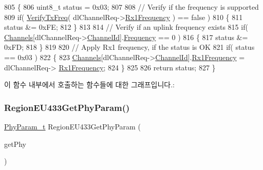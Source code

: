 \begin{DoxyCode}
805 \{
806     uint8\_t status = 0x03;
807 
808     \textcolor{comment}{// Verify if the frequency is supported}
809     \textcolor{keywordflow}{if}( \mbox{\hyperlink{_region_e_u433_8c_af6b3cfa164d4105815aaaa55f02d723e}{VerifyTxFreq}}( dlChannelReq->\mbox{\hyperlink{structs_dl_channel_req_params_a8a564b8635b12d5f0f348ae177dd92e1}{Rx1Frequency}} ) == \textcolor{keyword}{false} )
810     \{
811         status &= 0xFE;
812     \}
813 
814     \textcolor{comment}{// Verify if an uplink frequency exists}
815     \textcolor{keywordflow}{if}( \mbox{\hyperlink{_region_e_u433_8c_a989ac3355f1ed5b534b3940af3deeb14}{Channels}}[dlChannelReq->\mbox{\hyperlink{structs_dl_channel_req_params_ae23f953dc29c360e56a3c856404a3276}{ChannelId}}].\mbox{\hyperlink{structs_channel_params_ade3d190636488dad9a89b19446b7acf1}{Frequency}} == 0 )
816     \{
817         status &= 0xFD;
818     \}
819 
820     \textcolor{comment}{// Apply Rx1 frequency, if the status is OK}
821     \textcolor{keywordflow}{if}( status == 0x03 )
822     \{
823         \mbox{\hyperlink{_region_e_u433_8c_a989ac3355f1ed5b534b3940af3deeb14}{Channels}}[dlChannelReq->\mbox{\hyperlink{structs_dl_channel_req_params_ae23f953dc29c360e56a3c856404a3276}{ChannelId}}].\mbox{\hyperlink{structs_channel_params_a8a564b8635b12d5f0f348ae177dd92e1}{Rx1Frequency}} = dlChannelReq->
      \mbox{\hyperlink{structs_dl_channel_req_params_a8a564b8635b12d5f0f348ae177dd92e1}{Rx1Frequency}};
824     \}
825 
826     \textcolor{keywordflow}{return} status;
827 \}
\end{DoxyCode}
이 함수 내부에서 호출하는 함수들에 대한 그래프입니다.\+:
\mbox{\label{group___r_e_g_i_o_n_e_u433_ga407d34fe6c7dea18b07732d03b62894b}} 
\subsubsection{\texorpdfstring{Region\+E\+U433\+Get\+Phy\+Param()}{RegionEU433GetPhyParam()}}
{\footnotesize\ttfamily \mbox{\hyperlink{group___r_e_g_i_o_n_gaed159b26e5c4677236b6e8677019db30}{Phy\+Param\+\_\+t}} Region\+E\+U433\+Get\+Phy\+Param (\begin{DoxyParamCaption}\item[{\mbox{\hyperlink{group___r_e_g_i_o_n_gab471483fff904f4f89bbc03f7fc380ab}{Get\+Phy\+Params\+\_\+t}} $\ast$}]{get\+Phy }\end{DoxyParamCaption})}



